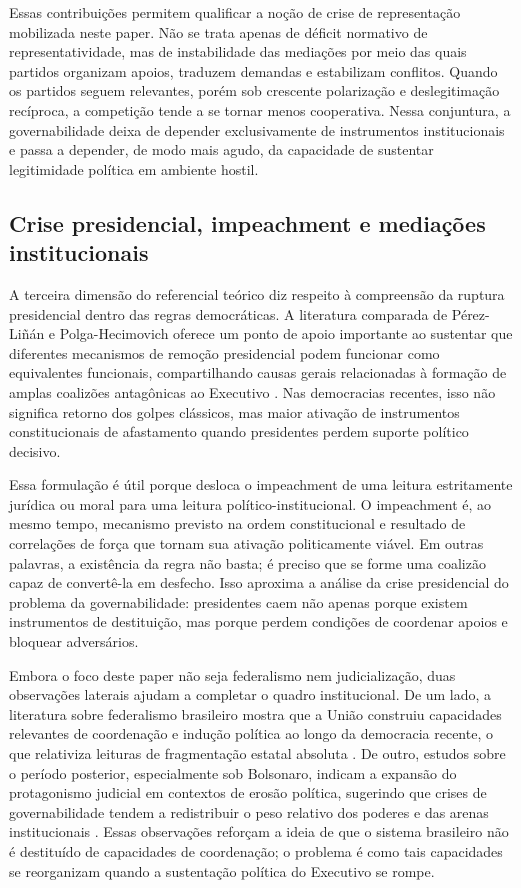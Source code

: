 \documentclass[12pt,a4paper]{article}
\begin{document}
Essas contribuições permitem qualificar a noção de crise de representação mobilizada neste paper. Não se trata apenas de déficit normativo de representatividade, mas de instabilidade das mediações por meio das quais partidos organizam apoios, traduzem demandas e estabilizam conflitos. Quando os partidos seguem relevantes, porém sob crescente polarização e deslegitimação recíproca, a competição tende a se tornar menos cooperativa. Nessa conjuntura, a governabilidade deixa de depender exclusivamente de instrumentos institucionais e passa a depender, de modo mais agudo, da capacidade de sustentar legitimidade política em ambiente hostil.

\subsection{Crise presidencial, impeachment e mediações institucionais}
\label{sec:org0302cdc}
A terceira dimensão do referencial teórico diz respeito à compreensão da ruptura presidencial dentro das regras democráticas. A literatura comparada de Pérez-Liñán e Polga-Hecimovich oferece um ponto de apoio importante ao sustentar que diferentes mecanismos de remoção presidencial podem funcionar como equivalentes funcionais, compartilhando causas gerais relacionadas à formação de amplas coalizões antagônicas ao Executivo \textcite{perez_lian2016_explaining_military}. Nas democracias recentes, isso não significa retorno dos golpes clássicos, mas maior ativação de instrumentos constitucionais de afastamento quando presidentes perdem suporte político decisivo.

Essa formulação é útil porque desloca o impeachment de uma leitura estritamente jurídica ou moral para uma leitura político-institucional. O impeachment é, ao mesmo tempo, mecanismo previsto na ordem constitucional e resultado de correlações de força que tornam sua ativação politicamente viável. Em outras palavras, a existência da regra não basta; é preciso que se forme uma coalizão capaz de convertê-la em desfecho. Isso aproxima a análise da crise presidencial do problema da governabilidade: presidentes caem não apenas porque existem instrumentos de destituição, mas porque perdem condições de coordenar apoios e bloquear adversários.

Embora o foco deste paper não seja federalismo nem judicialização, duas observações laterais ajudam a completar o quadro institucional. De um lado, a literatura sobre federalismo brasileiro mostra que a União construiu capacidades relevantes de coordenação e indução política ao longo da democracia recente, o que relativiza leituras de fragmentação estatal absoluta \textcite{oliveira2019_momentos_da}. De outro, estudos sobre o período posterior, especialmente sob Bolsonaro, indicam a expansão do protagonismo judicial em contextos de erosão política, sugerindo que crises de governabilidade tendem a redistribuir o peso relativo dos poderes e das arenas institucionais \textcite{vieira2022_supremocracia_e}. Essas observações reforçam a ideia de que o sistema brasileiro não é destituído de capacidades de coordenação; o problema é como tais capacidades se reorganizam quando a sustentação política do Executivo se rompe.
\end{document}
